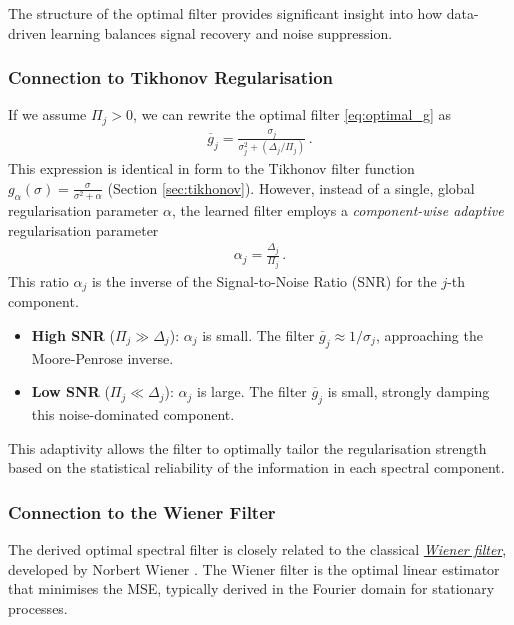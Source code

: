 The structure of the optimal filter provides significant insight into how data-driven learning balances signal recovery and noise suppression.

\subsubsection{Connection to Tikhonov Regularisation}

If we assume $\Pi_j > 0$, we can rewrite the optimal filter \eqref{eq:optimal_g} as
\begin{align*}
\overline{g}_j = \frac{\sigma_j}{\sigma_j^2 + (\Delta_j / \Pi_j)} \, .
\end{align*}
This expression is identical in form to the Tikhonov filter function $g_\alpha(\sigma) = \frac{\sigma}{\sigma^2 + \alpha}$ (Section \ref{sec:tikhonov}). However, instead of a single, global regularisation parameter $\alpha$, the learned filter employs a \emph{component-wise adaptive} regularisation parameter
\begin{align*}
\alpha_j = \frac{\Delta_j}{\Pi_j} \, .
\end{align*}
This ratio $\alpha_j$ is the inverse of the Signal-to-Noise Ratio (SNR) for the $j$-th component.
\begin{itemize}
\item \textbf{High SNR} ($\Pi_j \gg \Delta_j$): $\alpha_j$ is small. The filter $\overline{g}_j \approx 1/\sigma_j$, approaching the Moore-Penrose inverse.
\item \textbf{Low SNR} ($\Pi_j \ll \Delta_j$): $\alpha_j$ is large. The filter $\overline{g}_j$ is small, strongly damping this noise-dominated component.
\end{itemize}
This adaptivity allows the filter to optimally tailor the regularisation strength based on the statistical reliability of the information in each spectral component.

\subsubsection{Connection to the Wiener Filter}

The derived optimal spectral filter is closely related to the classical \href{https://en.wikipedia.org/wiki/Wiener_filter}{\emph{Wiener filter}}, developed by Norbert Wiener \cite{wiener1949extrapolation}. The Wiener filter is the optimal linear estimator that minimises the MSE, typically derived in the Fourier domain for stationary processes.

